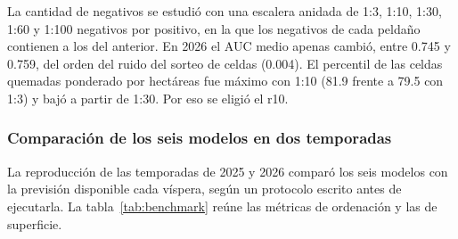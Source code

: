 \documentclass[10pt,a4paper]{article}
\begin{document}
La cantidad de negativos se estudió con una escalera anidada de 1:3, 1:10, 1:30,
1:60 y 1:100 negativos por positivo, en la que los negativos de cada peldaño
contienen a los del anterior. En 2026 el AUC medio apenas cambió, entre 0.745 y
0.759, del orden del ruido del sorteo de celdas (0.004). El percentil de las
celdas quemadas ponderado por hectáreas fue máximo con 1:10 (81.9 frente a 79.5
con 1:3) y bajó a partir de 1:30. Por eso se eligió el r10.



\subsubsection{Comparación de los seis modelos en dos temporadas}
\label{an:b2-benchmark}

La reproducción de las temporadas de 2025 y 2026 comparó los seis modelos con
la previsión disponible cada víspera, según un protocolo escrito antes de
ejecutarla. La tabla~\ref{tab:benchmark} reúne las métricas de ordenación y las
de superficie.
\end{document}

